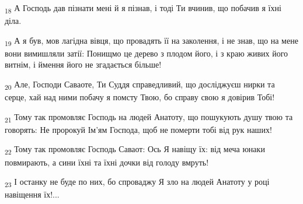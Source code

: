 \begin{tcolorbox}
\textsubscript{18} А Господь дав пізнати мені й я пізнав, і тоді Ти вчинив, що побачив я їхні діла.
\end{tcolorbox}
\begin{tcolorbox}
\textsubscript{19} А я був, мов лагідна вівця, що провадять її на заколення, і не знав, що на мене вони вимишляли затії: Понищмо це дерево з плодом його, і з краю живих його витнім, і ймення його не згадається більше!
\end{tcolorbox}
\begin{tcolorbox}
\textsubscript{20} Але, Господи Саваоте, Ти Суддя справедливий, що досліджуєш нирки та серце, хай над ними побачу я помсту Твою, бо справу свою я довірив Тобі!
\end{tcolorbox}
\begin{tcolorbox}
\textsubscript{21} Тому так промовляє Господь на людей Анатоту, що пошукують душу твою та говорять: Не пророкуй Ім'ям Господа, щоб не померти тобі від рук наших!
\end{tcolorbox}
\begin{tcolorbox}
\textsubscript{22} Тому так промовляє Господь Саваот: Ось Я навіщу їх: від меча юнаки повмирають, а сини їхні та їхні дочки від голоду вмруть!
\end{tcolorbox}
\begin{tcolorbox}
\textsubscript{23} І останку не буде по них, бо спроваджу Я зло на людей Анатоту у році навіщення їх!...
\end{tcolorbox}
